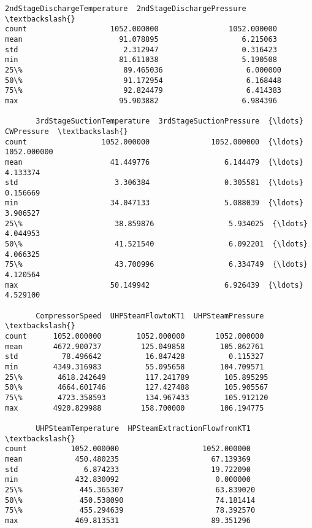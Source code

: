 \documentclass[11pt]{article}
\begin{document}
\begin{tcolorbox}[breakable, size=fbox, boxrule=.5pt, pad at break*=1mm, opacityfill=0]
\begin{Verbatim}[commandchars=\\\{\}]
       2ndStageDischargeTemperature  2ndStageDischargePressure  \textbackslash{}
count                   1052.000000                1052.000000
mean                      91.078895                   6.215063
std                        2.312947                   0.316423
min                       81.611038                   5.190508
25\%                       89.465036                   6.000000
50\%                       91.172954                   6.168448
75\%                       92.824479                   6.414383
max                       95.903882                   6.984396

       3rdStageSuctionTemperature  3rdStageSuctionPressure  {\ldots}   CWPressure  \textbackslash{}
count                 1052.000000              1052.000000  {\ldots}  1052.000000
mean                    41.449776                 6.144479  {\ldots}     4.133374
std                      3.306384                 0.305581  {\ldots}     0.156669
min                     34.047133                 5.088039  {\ldots}     3.906527
25\%                     38.859876                 5.934025  {\ldots}     4.044953
50\%                     41.521540                 6.092201  {\ldots}     4.066325
75\%                     43.700996                 6.334749  {\ldots}     4.120564
max                     50.149942                 6.926439  {\ldots}     4.529100

       CompressorSpeed  UHPSteamFlowtoKT1  UHPSteamPressure  \textbackslash{}
count      1052.000000        1052.000000       1052.000000
mean       4672.900737         125.049858        105.862761
std          78.496642          16.847428          0.115327
min        4349.316983          55.095658        104.709571
25\%        4618.242649         117.241789        105.895295
50\%        4664.601746         127.427488        105.905567
75\%        4723.358593         134.967433        105.912120
max        4920.829988         158.700000        106.194775

       UHPSteamTemperature  HPSteamExtractionFlowfromKT1  \textbackslash{}
count          1052.000000                   1052.000000
mean            450.480235                     67.139369
std               6.874233                     19.722090
min             432.830092                      0.000000
25\%             445.365307                     63.839020
50\%             450.538090                     74.181414
75\%             455.294639                     78.392570
max             469.813531                     89.351296


\end{Verbatim}
\end{tcolorbox}
\end{document}
